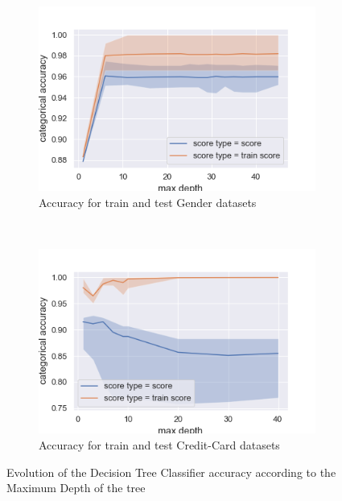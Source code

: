 \documentclass[10pt]{article}
\begin{document}
		\begin{figure}[]
			\centering
			\begin{subfigure}[]{0.45\columnwidth}
				\centering
				\includegraphics[width=\linewidth]{../graphics/tree_gender_max_depth_score_type_score_type.png}
				\caption{Accuracy for train and test Gender datasets}
				\label{tree:gender_train_vs_test}
			\end{subfigure}
			~
			\begin{subfigure}[]{0.45\columnwidth}
				\centering
				\includegraphics[width=\linewidth]{../graphics/tree_creditcard_max_depth_score_type_score_type.png}
				\caption{Accuracy for train and test Credit-Card datasets}
				\label{tree:creditcard_train_vs_test}
			\end{subfigure}
			\caption{Evolution of the Decision Tree Classifier accuracy according to the Maximum Depth of the tree}
			\label{tree:train_vs_test}
		\end{figure}
\end{document}
